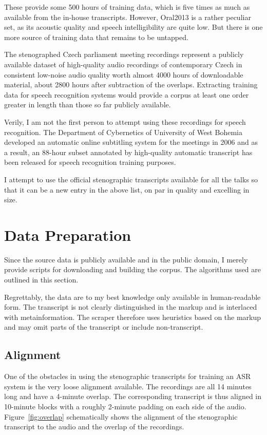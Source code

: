 \documentclass[12pt,a4paper]{report}
\begin{document}
These provide some 500 hours of training data, which is five times as much as
available from the in-house transcripts. However, Oral2013 is a rather peculiar
set, as its acoustic quality and speech intelligibility are quite low. But there
is one more source of training data that remains to be untapped.

The stenographed Czech parliament meeting recordings represent a publicly available dataset
of high-quality audio recordings of contemporary Czech in consistent low-noise
audio quality worth almost 4000 hours of downloadable material, about 2800 hours
after subtraction of the overlaps. Extracting
training data for speech recognition systems would provide a corpus at least
one order greater in length than those so far publicly available.

Verily, I am not the first person to attempt using these recordings for speech
recognition. The Department of Cybernetics of University of West Bohemia
developed an automatic online subtitling system for the meetings in
2006\cite{pspsubs} and as a result, an 88-hour subset annotated by high-quality
automatic transcript has been released for speech recognition training
purposes\cite{pspdata}.

I attempt to use the official stenographic transcripts available for all the
talks so that it can be a new entry in the above list, on par in quality and
excelling in size.

\section{Data Preparation}

Since the source data is publicly available and in the public domain, I merely
provide scripts for downloading and building the corpus. The algorithms
used are outlined in this section.

Regrettably, the data are to my best knowledge only available in human-readable
form. The transcript is not clearly distinguished in the markup and is
interlaced with metainformation. The scraper therefore uses heuristics based on
the markup and may omit parts of the transcript or include non-transcript.

\subsection{Alignment}

One of the obstacles in using the stenographic transcripts for training an ASR
system is the very loose alignment available. The recordings are all 14 minutes
long and have a 4-minute overlap. The corresponding transcript is thus aligned
in 10-minute blocks with a roughly 2-minute padding on each side of the audio.
Figure~\ref{fig:overlap} schematically shows the alignment of the stenographic
transcript to the audio and the overlap of the recordings.
\end{document}
